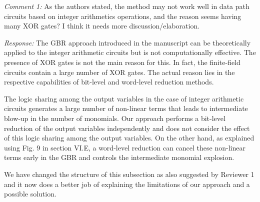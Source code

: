 \documentclass[conference, onecolumn]{IEEEtran}
\begin{document}
\par{\it Comment 1:} As the authors stated, the method may not work well in data path circuits based on integer arithmetics operations, and the reason seems having many XOR gates? I think it needs more discussion/elaboration.
\par{\it Response:} The GBR approach introduced in the manuscript can
be theoretically applied to the integer arithmetic circuits but is not  
computationally effective. The presence of XOR gates is not the main
reason for this. In fact, the finite-field circuits contain a large
number of XOR gates. The actual reason lies in the respective
capabilities of bit-level and word-level reduction methods.  

\par The logic sharing among the output variables in the case of
integer arithmetic circuits generates a large number of non-linear
terms that leads to intermediate blow-up in the number of
monomials. Our approach performs a bit-level reduction of the output
variables independently and does not consider the effect of this logic
sharing among the output variables. On the other hand, as explained
using Fig. 9 in section VI.E, a word-level reduction can cancel these
non-linear terms early in the GBR and controls the intermediate
monomial explosion. 
\par We have changed the structure of this subsection as also
suggested by Reviewer 1 and it now does a better job of explaining the
limitations of our approach and a possible solution.
\end{document}
